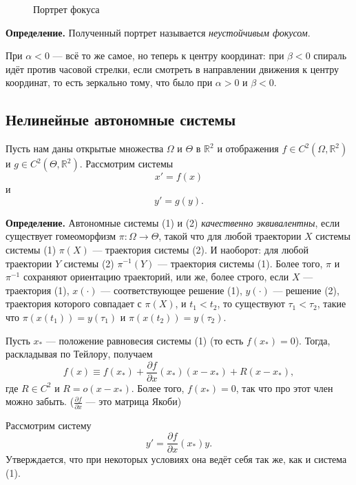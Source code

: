 \begin{figure}[ht]
    \centering
    \caption{Портрет фокуса}
\end{figure}

\textbf{Определение.} Полученный портрет называется \textit{неустойчивым фокусом}.

При $\alpha < 0$ --- всё то же самое, но теперь к центру координат: при $\beta < 0$ спираль идёт против часовой стрелки, если смотреть в направлении движения к центру координат, то есть зеркально тому, что было при $\alpha > 0$ и $\beta < 0$.

\subsection{Нелинейные автономные системы}
Пусть нам даны открытые множества $\Omega$ и $\Theta$ в $\mathbb R^2$ и отображения $f \in C^2(\Omega, \mathbb R^2)$ и $g \in C^2(\Theta, \mathbb R^2)$.
Рассмотрим системы
\begin{equation}
    x' = f(x)
\end{equation}
и
\begin{equation}
    y' = g(y).
\end{equation}

\textbf{Определение.} Автономные системы (1) и (2) \textit{качественно эквивалентны}, если существует гомеоморфизм $\pi: \Omega \to \Theta$, такой что для любой траектории $X$ системы системы (1) $\pi(X)$ --- траектория системы (2).
И наоборот: для любой траектории $Y$ системы (2) $\pi^{-1}(Y)$ --- траектория системы (1).
Более того, $\pi$ и $\pi^{-1}$ сохраняют ориентацию траекторий, или же, более строго, если $X$ --- траектория (1), $x(\cdot)$ --- соответствующее решение (1), $y(\cdot)$ --- решение (2), траектория которого совпадает с $\pi(X)$, и $t_1 < t_2$, то существуют $\tau_1 < \tau_2$, такие что $\pi(x(t_1)) = y(\tau_1)$ и $\pi(x(t_2)) = y(\tau_2)$.

Пусть $x_*$ --- положение равновесия системы (1) (то есть $f(x_*) = 0$).
Тогда, раскладывая по Тейлору, получаем
\[
    f(x) \equiv f(x_*) + \frac{\partial f}{\partial x}(x_*)(x - x_*) + R(x - x_*),
\]
где $R \in C^2$ и $R = o(x - x_*)$. Более того, $f(x_*) = 0$, так что про этот член можно забыть.
($\frac{\partial f}{\partial x}$ --- это матрица Якоби)

Рассмотрим систему
\begin{equation}
    y' = \frac{\partial f}{\partial x}(x_*) y.
\end{equation}
Утверждается, что при некоторых условиях она ведёт себя так же, как и система (1).

